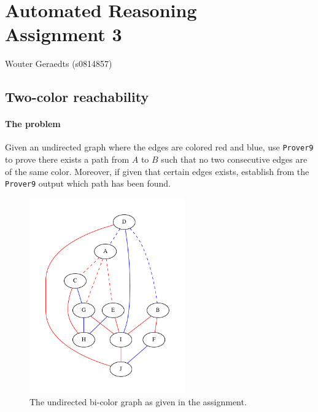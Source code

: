 \documentclass[12pt]{article}
\newcommand{\provernine}{\texttt{Prover9}\xspace}
\begin{document}
\section*{Automated Reasoning\\Assignment 3}

\begin{center}
Wouter Geraedts (s0814857)
\end{center}

\vspace{8mm}

\subsection*{Two-color reachability}

\paragraph{The problem}
Given an undirected graph where the edges are colored red and blue, use
\provernine to prove there exists a path from $A$ to $B$ such that no two
consecutive edges are of the same color.
Moreover, if given that certain edges exists, establish from the \provernine
output which path has been found.
\begin{figure}[H]
	\begin{center}
		\includegraphics[width=0.6\textwidth]{graph.pdf}
	\end{center}
	\caption{The undirected bi-color graph as given in the assignment.}
\end{figure}
\end{document}
